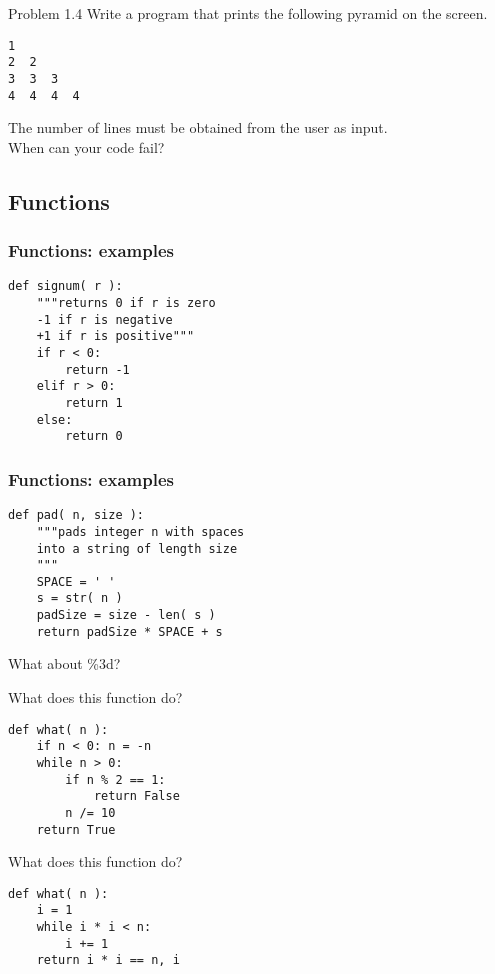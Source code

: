 \documentclass[14pt,compress]{beamer}
\newcounter{time}
\newcommand{\inctime}[1]{\addtocounter{time}{#1}{\tiny \thetime\ m}}
\begin{document}
\begin{frame}[fragile]{Problem 1.4}
  Write a program that prints the following pyramid on the screen. 
  \begin{lstlisting}
1
2  2
3  3  3
4  4  4  4
  \end{lstlisting}
The number of lines must be obtained from the user as input.\\
\pause
When can your code fail?
\only<2->{\inctime{20}}
\end{frame}


\subsection{Functions}
\begin{frame}[fragile]
\frametitle{Functions: examples}
  \begin{lstlisting}
def signum( r ):
    """returns 0 if r is zero
    -1 if r is negative
    +1 if r is positive"""
    if r < 0:
        return -1
    elif r > 0:
        return 1
    else:
        return 0
  \end{lstlisting}
\end{frame}

\begin{frame}[fragile]
  \frametitle{Functions: examples}
  \begin{lstlisting}
def pad( n, size ): 
    """pads integer n with spaces
    into a string of length size
    """
    SPACE = ' '
    s = str( n )
    padSize = size - len( s )
    return padSize * SPACE + s
  \end{lstlisting}
\pause
What about \%3d?
\end{frame}

\begin{frame}[fragile]
  {What does this function do?}
  \begin{lstlisting}
def what( n ):
    if n < 0: n = -n
    while n > 0:
        if n % 2 == 1:
            return False
        n /= 10
    return True
  \end{lstlisting}
\end{frame}

\begin{frame}[fragile]
  {What does this function do?}
\begin{lstlisting}
def what( n ):
    i = 1    
    while i * i < n:
        i += 1
    return i * i == n, i
  \end{lstlisting}
\end{frame}
\end{document}
